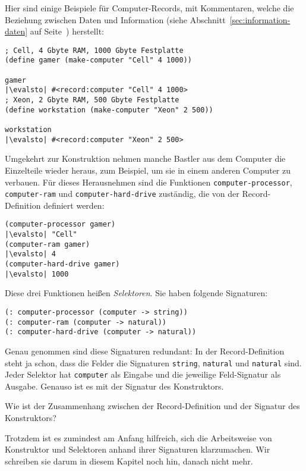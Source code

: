 Hier sind einige Beispiele für Computer-Records, mit Kommentaren,
welche die Beziehung zwischen Daten und Information (siehe
Abschnitt~\ref{sec:information-daten} auf
Seite~\pageref{sec:information-daten}) herstellt:
%
\begin{lstlisting}
; Cell, 4 Gbyte RAM, 1000 Gbyte Festplatte
(define gamer (make-computer "Cell" 4 1000))

gamer
|\evalsto| #<record:computer "Cell" 4 1000>
; Xeon, 2 Gbyte RAM, 500 Gbyte Festplatte
(define workstation (make-computer "Xeon" 2 500))

workstation
|\evalsto| #<record:computer "Xeon" 2 500>
\end{lstlisting}
%
Umgekehrt zur Konstruktion nehmen manche Bastler aus dem Computer die
Einzelteile wieder heraus, zum Beispiel, um sie in einem anderen
Computer zu verbauen. Für dieses Herausnehmen sind die Funktionen
\lstinline{computer-processor}, \lstinline{computer-ram} und
\lstinline{computer-hard-drive} zuständig, die von der
Record-Definition definiert werden:
%
\begin{lstlisting}
(computer-processor gamer)
|\evalsto| "Cell"
(computer-ram gamer)
|\evalsto| 4
(computer-hard-drive gamer)
|\evalsto| 1000
\end{lstlisting}
%
Diese drei Funktionen heißen \textit{Selektoren}.  Sie haben
folgende Signaturen:
%
\begin{lstlisting}
(: computer-processor (computer -> string))
(: computer-ram (computer -> natural))
(: computer-hard-drive (computer -> natural))
\end{lstlisting}
%
Genau genommen sind diese Signaturen redundant: In der
Record-Definition steht ja schon, dass die Felder die Signaturen
\lstinline{string}, \lstinline{natural} und \lstinline{natural} sind.  Jeder
Selektor hat \lstinline{computer} als Eingabe und die jeweilige
Feld-Signatur als Ausgabe.  Genauso ist es mit der Signatur des
Konstruktors.
%
\begin{aufgabeinline}
  Wie ist der Zusammenhang zwischen der Record-Definition und der
  Signatur des Konstruktors?
\end{aufgabeinline}
%
Trotzdem ist es zumindest am Anfang hilfreich, sich die Arbeitsweise
von Konstruktor und Selektoren anhand ihrer Signaturen klarzumachen.
Wir schreiben sie darum in diesem Kapitel noch hin, danach nicht mehr.

